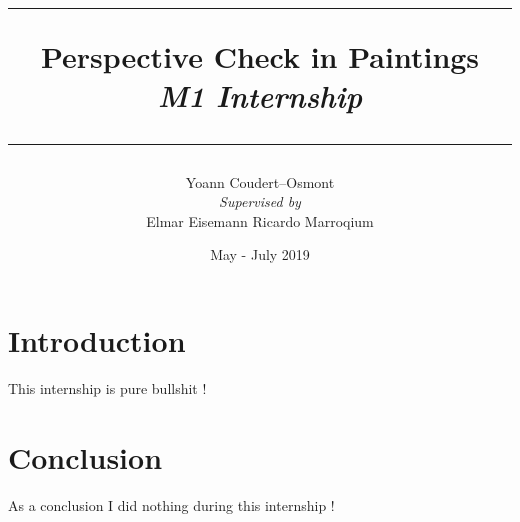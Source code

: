\documentclass{article}
\title{
	\rule{\linewidth}{0.4mm}
	\textbf{Perspective Check in Paintings} \\
	\textit{M1 Internship}
	\rule{\linewidth}{0.6mm}
}
\author{
	Yoann Coudert--Osmont \\[3mm]
	\textit{Supervised by} \\
	Elmar Eisemann \qquad Ricardo Marroqium \\[2mm]
}
\date{May - July 2019}
\begin{document}
	\maketitle
	
	\section{Introduction}
	
	This internship is pure bullshit !
	
	\section{Conclusion}
	
	As a conclusion I did nothing during this internship !
	
\end{document}
